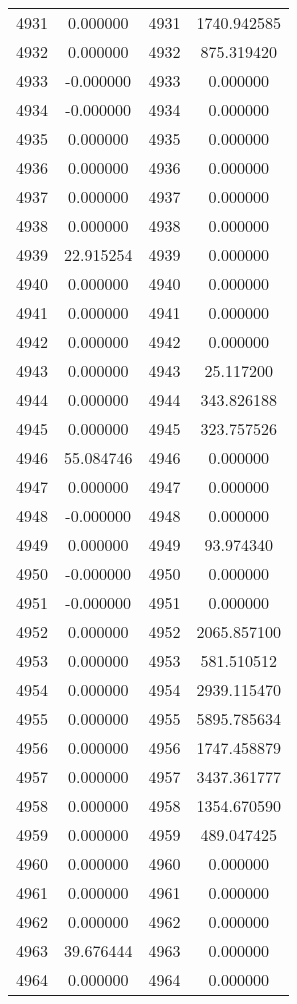 \documentclass[12pt]{article}
\begin{document}
\begin{longtable}{@{}cccc@{}}
4931 & 0.000000 & 4931 & 1740.942585 \\
4932 & 0.000000 & 4932 & 875.319420 \\
4933 & -0.000000 & 4933 & 0.000000 \\
4934 & -0.000000 & 4934 & 0.000000 \\
4935 & 0.000000 & 4935 & 0.000000 \\
4936 & 0.000000 & 4936 & 0.000000 \\
4937 & 0.000000 & 4937 & 0.000000 \\
4938 & 0.000000 & 4938 & 0.000000 \\
4939 & 22.915254 & 4939 & 0.000000 \\
4940 & 0.000000 & 4940 & 0.000000 \\
4941 & 0.000000 & 4941 & 0.000000 \\
4942 & 0.000000 & 4942 & 0.000000 \\
4943 & 0.000000 & 4943 & 25.117200 \\
4944 & 0.000000 & 4944 & 343.826188 \\
4945 & 0.000000 & 4945 & 323.757526 \\
4946 & 55.084746 & 4946 & 0.000000 \\
4947 & 0.000000 & 4947 & 0.000000 \\
4948 & -0.000000 & 4948 & 0.000000 \\
4949 & 0.000000 & 4949 & 93.974340 \\
4950 & -0.000000 & 4950 & 0.000000 \\
4951 & -0.000000 & 4951 & 0.000000 \\
4952 & 0.000000 & 4952 & 2065.857100 \\
4953 & 0.000000 & 4953 & 581.510512 \\
4954 & 0.000000 & 4954 & 2939.115470 \\
4955 & 0.000000 & 4955 & 5895.785634 \\
4956 & 0.000000 & 4956 & 1747.458879 \\
4957 & 0.000000 & 4957 & 3437.361777 \\
4958 & 0.000000 & 4958 & 1354.670590 \\
4959 & 0.000000 & 4959 & 489.047425 \\
4960 & 0.000000 & 4960 & 0.000000 \\
4961 & 0.000000 & 4961 & 0.000000 \\
4962 & 0.000000 & 4962 & 0.000000 \\
4963 & 39.676444 & 4963 & 0.000000 \\
4964 & 0.000000 & 4964 & 0.000000 \\

\end{longtable}
\end{document}
